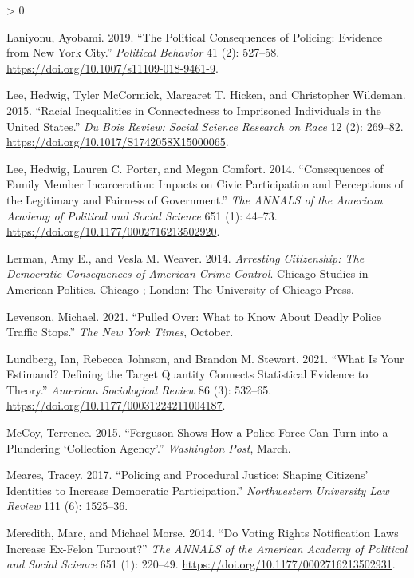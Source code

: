 \documentclass[
  12pt,
]{article}
\newlength{\cslhangindent}
\newenvironment{CSLReferences}[2] %
 {%
  \setlength{\parindent}{0pt}
  \ifodd #1 \everypar{\setlength{\hangindent}{\cslhangindent}}\ignorespaces\fi
  \ifnum #2 > 0
  \setlength{\parskip}{#2\baselineskip}
  \fi
 }%
 {}
\begin{document}
\begin{CSLReferences}{1}{0}
\leavevmode\hypertarget{ref-Laniyonu2019}{}%
Laniyonu, Ayobami. 2019. {``The {Political Consequences} of {Policing}: {Evidence} from {New York City}.''} \emph{Political Behavior} 41 (2): 527--58. \url{https://doi.org/10.1007/s11109-018-9461-9}.

\leavevmode\hypertarget{ref-Lee2015}{}%
Lee, Hedwig, Tyler McCormick, Margaret T. Hicken, and Christopher Wildeman. 2015. {``Racial {Inequalities} in {Connectedness} to {Imprisoned Individuals} in the {United States}.''} \emph{Du Bois Review: Social Science Research on Race} 12 (2): 269--82. \url{https://doi.org/10.1017/S1742058X15000065}.

\leavevmode\hypertarget{ref-Lee2014}{}%
Lee, Hedwig, Lauren C. Porter, and Megan Comfort. 2014. {``Consequences of {Family Member Incarceration}: {Impacts} on {Civic Participation} and {Perceptions} of the {Legitimacy} and {Fairness} of {Government}.''} \emph{The ANNALS of the American Academy of Political and Social Science} 651 (1): 44--73. \url{https://doi.org/10.1177/0002716213502920}.

\leavevmode\hypertarget{ref-Lerman2014}{}%
Lerman, Amy E., and Vesla M. Weaver. 2014. \emph{Arresting Citizenship: The Democratic Consequences of {American} Crime Control}. Chicago Studies in {American} Politics. {Chicago ; London}: {The University of Chicago Press}.

\leavevmode\hypertarget{ref-Levenson2021}{}%
Levenson, Michael. 2021. {``Pulled {Over}: {What} to {Know About Deadly Police Traffic Stops}.''} \emph{The New York Times}, October.

\leavevmode\hypertarget{ref-Lundberg2021}{}%
Lundberg, Ian, Rebecca Johnson, and Brandon M. Stewart. 2021. {``What {Is Your Estimand}? {Defining} the {Target Quantity Connects Statistical Evidence} to {Theory}.''} \emph{American Sociological Review} 86 (3): 532--65. \url{https://doi.org/10.1177/00031224211004187}.

\leavevmode\hypertarget{ref-McCoy2015}{}%
McCoy, Terrence. 2015. {``Ferguson Shows How a Police Force Can Turn into a Plundering {`Collection Agency'}.''} \emph{Washington Post}, March.

\leavevmode\hypertarget{ref-Meares2017}{}%
Meares, Tracey. 2017. {``Policing and {Procedural Justice}: {Shaping Citizens}' {Identities} to {Increase Democratic Participation}.''} \emph{Northwestern University Law Review} 111 (6): 1525--36.

\leavevmode\hypertarget{ref-Meredith2014}{}%
Meredith, Marc, and Michael Morse. 2014. {``Do {Voting Rights Notification Laws Increase Ex-Felon Turnout}?''} \emph{The ANNALS of the American Academy of Political and Social Science} 651 (1): 220--49. \url{https://doi.org/10.1177/0002716213502931}.


\end{CSLReferences}
\end{document}
